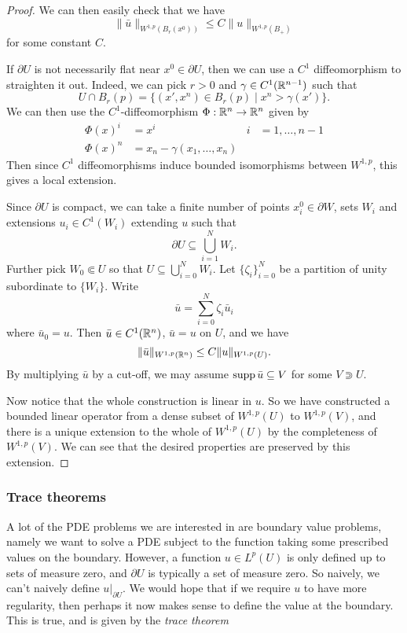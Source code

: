 \documentclass[a4paper]{article}
\begin{document}
\begin{proof}
  We can then easily check that we have
  \[
    \|\bar{u}\|_{W^{1, p}(B_r(x^0))} \leq C \|u\|_{W^{1, p}(B_+)}
  \]
  for some constant $C$.

  If $\partial U$ is not necessarily flat near $x^0 \in \partial U$, then we can use a $C^1$ diffeomorphism to straighten it out. Indeed, we can pick $r > 0$ and $\gamma \in C^1(\mathbb{R}^{n - 1})$ such that
  \[
    U \cap B_r(p) = \{(x', x^n) \in B_r(p) \mid x^n > \gamma(x')\}.
  \]
  We can then use the $C^1$-diffeomorphism $\Phi: \mathbb{R}^n \to \mathbb{R}^n$ given by
  \begin{align*}
    \Phi(x)^i &= x^i & i &= 1, \ldots, n -1\\
    \Phi(x)^n &= x_n - \gamma(x_1, \ldots, x_n)
  \end{align*}
  Then since $C^1$ diffeomorphisms induce bounded isomorphisms between $W^{1, p}$, this gives a local extension.

  Since $\partial U$ is compact, we can take a finite number of points $x_i^0 \in \partial W$, sets $W_i$ and extensions $u_i \in C^1(W_i)$ extending $u$ such that
  \[
    \partial U \subseteq \bigcup_{i = 1}^N W_i.
  \]
  Further pick $W_0 \Subset U$ so that $U \subseteq \bigcup_{i = 0}^N W_i$. Let $\{\zeta_i\}_{i = 0}^N$ be a partition of unity subordinate to $\{W_i\}$. Write
  \[
    \bar{u} = \sum_{i = 0}^N \zeta_i \bar{u}_i
  \]
  where $\bar{u}_0 = u$. Then $\bar{u} \in C^1(\mathbb{R}^n)$, $\bar{u} = u$ on $U$, and we have
  \[
    \|\bar{u}\|_{W^{1, p}(\mathbb{R}^n)} \leq C \|u\|_{W^{1, p}(U)}.
  \]
  By multiplying $\bar{u}$ by a cut-off, we may assume $\operatorname{supp} \bar{u} \subseteq V$ for some $V \Supset U$.

  Now notice that the whole construction is linear in $u$. So we have constructed a bounded linear operator from a dense subset of $W^{1, p}(U)$ to $W^{1,p}(V)$, and there is a unique extension to the whole of $W^{1, p}(U)$ by the completeness of $W^{1, p}(V)$. We can see that the desired properties are preserved by this extension.
\end{proof}

\subsubsection*{Trace theorems}
A lot of the PDE problems we are interested in are boundary value problems, namely we want to solve a PDE subject to the function taking some prescribed values on the boundary. However, a function $u \in L^p(U)$ is only defined up to sets of measure zero, and $\partial U$ is typically a set of measure zero. So naively, we can't naively define $u|_{\partial U}$. We would hope that if we require $u$ to have more regularity, then perhaps it now makes sense to define the value at the boundary. This is true, and is given by the \emph{trace theorem}
\end{document}

